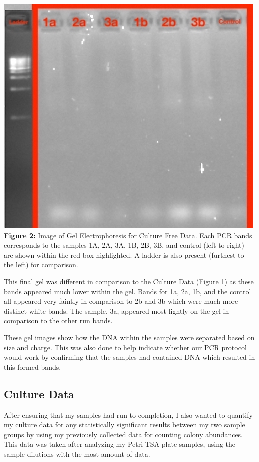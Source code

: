 \documentclass[]{article}
\begin{document}
\includegraphics{data/images/gel_images/2019-09-25_Culture_free_PCRs_BIOL422_Zimmerman.jpg}
\textbf{Figure 2:} Image of Gel Electrophoresis for Culture Free Data.
Each PCR bands corresponds to the samples 1A, 2A, 3A, 1B, 2B, 3B, and
control (left to right) are shown within the red box highlighted. A
ladder is also present (furthest to the left) for comparison.

This final gel was different in comparison to the Culture Data (Figure
1) as these bands appeared much lower within the gel. Bands for 1a, 2a,
1b, and the control all appeared very faintly in comparison to 2b and 3b
which were much more distinct white bands. The sample, 3a, appeared most
lightly on the gel in comparison to the other run bands.

These gel images show how the DNA within the samples were separated
based on size and charge. This was also done to help indicate whether
our PCR protocol would work by confirming that the samples had contained
DNA which resulted in this formed bands.

\hypertarget{culture-data}{%
\subsection{Culture Data}\label{culture-data}}

After ensuring that my samples had run to completion, I also wanted to
quantify my culture data for any statistically significant results
between my two sample groups by using my previously collected data for
counting colony abundances. This data was taken after analyzing my Petri
TSA plate samples, using the sample dilutions with the most amount of
data.
\end{document}
